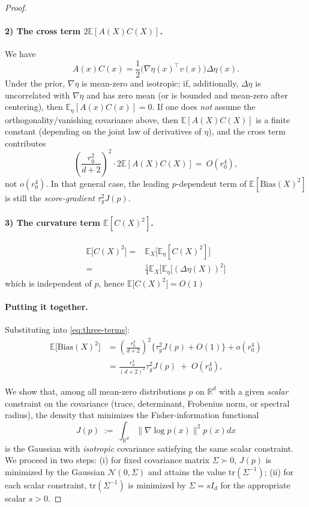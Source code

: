 \begin{proof}
\paragraph{2) The cross term $2\mathbb{E}[A(X)C(X)]$.}
We have
\[
A(x)C(x)=\frac{1}{2}\big(\nabla\eta(x)^\top v(x)\big)\Delta\eta(x).
\]
Under the prior, $\nabla\eta$ is mean-zero and isotropic; if, additionally, $\Delta\eta$ is uncorrelated with $\nabla\eta$ and has zero mean (or is bounded and mean-zero after centering), then $\mathbb{E}_\eta[A(x)C(x)]=0$.  If one does \emph{not} assume the orthogonality/vanishing covariance above, then $\mathbb{E}[A(X)C(X)]$ is a finite constant (depending on the joint law of derivatives of $\eta$), and the cross term contributes
\[
\left(\frac{r_0^2}{d+2}\right)^2\cdot 2\mathbb{E}[A(X)C(X)]
=\ O(r_0^4),
\]
not $o(r_0^4)$. In that general case, the leading $p$-dependent term of $\mathbb{E}[\mathrm{Bias}(X)^2]$ is still the \emph{score-gradient} $\tau_g^2J(p)$.



\paragraph{3) The curvature term $\mathbb{E}[C(X)^2]$.}


\begin{align*}
\mathbb{E}\big[C(X)^2\big]
=&\mathbb{E}_X\big[\mathbb{E}_\eta[C(X)^2]\big]\\
=&\frac{1}{4}\mathbb{E}_X\big[\mathbb{E}_\eta[(\Delta\eta(X))^2\big]
\end{align*}
which is independent of $p$, hence $\mathbb{E}\big[C(X)^2\big]=O(1)$ 


\paragraph{Putting it together.}
Substituting into \eqref{eq:three-terms}:
\begin{align*}
\mathbb{E}\big[\mathrm{Bias}(X)^2\big]
&=\left(\frac{r_0^2}{d+2}\right)^2\Big\{\tau_g^2J(p) + O(1)\Big\} + o(r_0^4)\\
&=\frac{r_0^4}{(d+2)^2}\tau_g^2J(p)\;+\;O(r_0^4),
\end{align*}






We show that, among all mean-zero distributions $p$ on $\mathbb{R}^d$ with a given \emph{scalar} constraint on the covariance (trace, determinant, Frobenius norm, or spectral radius), the density that minimizes the Fisher-information functional
\[
J(p)\;:=\;\int_{\mathbb{R}^d}\|\nabla\log p(x)\|^2p(x)dx
\]
is the Gaussian with \emph{isotropic} covariance satisfying the same scalar constraint.
\medskip
\noindent
We proceed in two steps: (i) for fixed covariance matrix $\Sigma\succ 0$, $J(p)$ is minimized by the Gaussian $\mathcal{N}(0,\Sigma)$ and attains the value $\mathrm{tr}(\Sigma^{-1})$; (ii) for each scalar constraint, $\mathrm{tr}(\Sigma^{-1})$ is minimized by $\Sigma=sI_d$ for the appropriate scalar $s>0$.



\end{proof}
